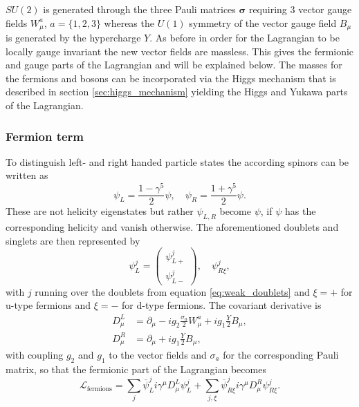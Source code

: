 $SU(2)$ is generated through the three Pauli matrices $\bm{\sigma}$ requiring 3 vector gauge fields $W^a_\mu$, $a=\{1,2,3\}$ whereas the $U(1)$ symmetry of the vector gauge field $B_\mu$ is generated by the hypercharge $Y$. As before in order for the Lagrangian to be locally gauge invariant the new vector fields are massless. This gives the fermionic and gauge parts of the Lagrangian and will be explained below. The masses for the fermions and bosons can be incorporated via the Higgs mechanism that is described in section \ref{sec:higgs_mechanism} yielding the Higgs and Yukawa parts of the Lagrangian.


\subsubsection*{Fermion term}
To distinguish left- and right handed particle states the according spinors can be written as
\begin{equation}
    \psi_L=\frac{1-\gamma^5}{2}\psi, \quad \psi_R=\frac{1+\gamma^5}{2}\psi.
\end{equation}
These are not helicity eigenstates but rather $\psi_{L,R}$ become $\psi$, if $\psi$ has the corresponding helicity and vanish otherwise. The aforementioned doublets and singlets are then represented by
\begin{equation}
    \psi_L^j=
    \begin{pmatrix}
        \psi_{L+}^j \\ \psi_{L-}^j
    \end{pmatrix},
    \quad \psi_{R\xi}^j,
\end{equation}
with $j$ running over the doublets from equation \ref{eq:weak_doublets} and $\xi=+$ for u-type fermions and $\xi=-$ for d-type fermions.
The covariant derivative is
\begin{align}
    D_\mu^L & =\partial_\mu- i g_2 \frac{{\sigma}_a}{2}W_\mu^a+i g_1\frac{Y}{2}B_\mu, \label{eq:cov_diff_L} \\
    D_\mu^R & =\partial_\mu+ i g_1\frac{Y}{2}B_\mu,
\end{align}
with coupling $g_2$ and $g_1$ to the vector fields and $\sigma_a$ for the corresponding Pauli matrix, so that the fermionic part of the Lagrangian becomes
\begin{equation}
    \mathcal {L}_\text{fermions} = \sum_j\overline{\psi}^j_L i \gamma^\mu D_\mu^L\psi_L^j+\sum_{j,\xi}\overline{\psi}^j_{R\xi} i \gamma^\mu D_\mu^R\psi_{R\xi}^j.
    \label{eq:L_fermion}
\end{equation}

